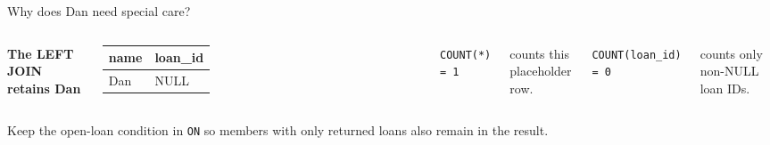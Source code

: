 \begin{frame}[t]{Why does Dan need special care?}
\begin{columns}[T,onlytextwidth]
\textbf{The LEFT JOIN retains Dan}\par\smallskip
\small\begin{tabular}{ll}\toprule name & loan\_id\\\midrule
Dan & NULL\\\bottomrule\end{tabular}
\texttt{COUNT(*) = 1}\par\smallskip counts this placeholder row.\par\medskip
\texttt{COUNT(loan\_id) = 0}\par\smallskip counts only non-NULL loan IDs.
\end{columns}\vspace{5mm}
Keep the open-loan condition in \texttt{ON} so members with only returned loans
also remain in the result.
\end{frame}
